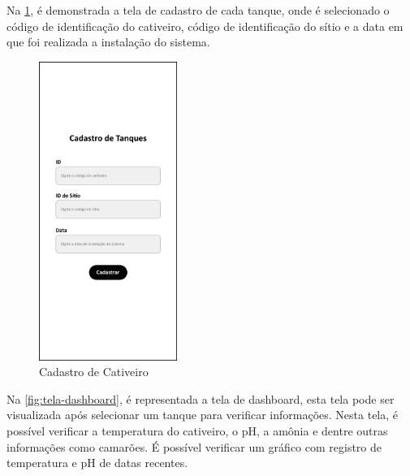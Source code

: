 \newpage

Na \cref{fig:tela-cativeiro}, é demonstrada a tela de cadastro de cada tanque, onde é selecionado o código de identificação do cativeiro, código de identificação do sítio e a data em que foi realizada a instalação do sistema.

\begin{figure}[!htb]
\centering
{}
\caption{Cadastro de Cativeiro}%
\label{fig:tela-cativeiro}
\includegraphics[width = 0.4\textwidth]{Imagens/CADASTRAR CATIVEIRO.png}
\end{figure}

\newpage

Na \cref{fig:tela-dashboard}, é representada a tela de dashboard, esta tela pode ser visualizada após selecionar um tanque para verificar informações. Nesta tela, é possível verificar a temperatura do cativeiro, o pH, a amônia e dentre outras informações como camarões. É possível verificar um gráfico com registro de temperatura e pH de datas recentes.

